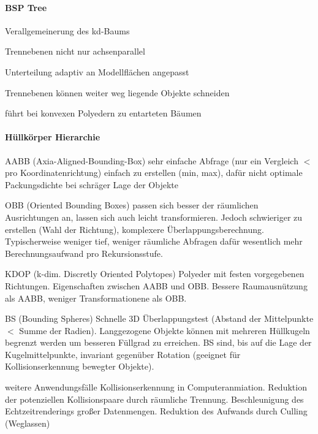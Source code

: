 \documentclass[landscape]{article}
\begin{document}
\begin{multicols}{3}
  \paragraph{BSP Tree}
  \begin{itemize*}
    \item Verallgemeinerung des kd-Baums
    \item Trennebenen nicht nur achsenparallel
    \item Unterteilung adaptiv an Modellflächen angepasst
    \item Trennebenen können weiter weg liegende Objekte schneiden
    \item führt bei konvexen Polyedern zu entarteten Bäumen
  \end{itemize*}
  
  \paragraph{Hüllkörper Hierarchie}
  \begin{description*}
    \item[AABB] (Axia-Aligned-Bounding-Box) sehr einfache Abfrage (nur ein Vergleich $<$ pro Koordinatenrichtung) einfach zu erstellen (min, max), dafür nicht optimale Packungsdichte bei schräger Lage der Objekte
    \item[OBB] (Oriented Bounding Boxes) passen sich besser der räumlichen Ausrichtungen an, lassen sich auch leicht transformieren. Jedoch schwieriger zu erstellen (Wahl der Richtung), komplexere Überlappungsberechnung. Typischerweise weniger tief, weniger räumliche Abfragen dafür wesentlich mehr Berechnungsaufwand pro Rekursionsstufe.
    \item[KDOP] (k-dim. Discretly Oriented Polytopes) Polyeder mit festen vorgegebenen Richtungen. Eigenschaften zwischen AABB und OBB. Bessere Raumausnützung als AABB, weniger Transformationene als OBB.
    \item[BS] (Bounding Spheres) Schnelle 3D Überlappungstest (Abstand der Mittelpunkte $<$ Summe der Radien). Langgezogene Objekte können mit mehreren Hüllkugeln begrenzt werden um besseren Füllgrad zu erreichen. BS sind, bis auf die Lage der Kugelmittelpunkte, invariant gegenüber Rotation (geeignet für Kollisionserkennung bewegter Objekte).
    \item[weitere Anwendungsfälle] Kollisionserkennung in Computeranmiation. Reduktion der potenziellen Kollisionspaare durch räumliche Trennung. Beschleunigung des Echtzeitrenderings großer Datenmengen. Reduktion des Aufwands durch Culling (Weglassen)
  \end{description*}
  

\end{multicols}
\end{document}
